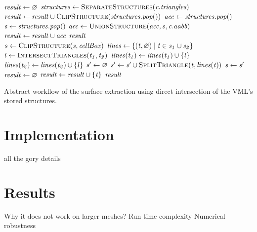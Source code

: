 \begin{algorithm}
	\centering
	\begin{algorithmic}
			\State $\mathit{result} \gets \varnothing$
					\State $\var{structures} \gets \Call{SeparateStructures}{\var{c.triangles}}$
						\State $\var{result} \gets \var{result} \cup \Call{ClipStructure}{\var{structures.pop()}}$
						\State $\mathit{acc} \gets \mathit{structures.pop()}$
							\State $\mathit{s} \gets \mathit{structures.pop()}$
							\State $\var{acc} \gets \Call{UnionStructure}{\var{acc}, \var{s}, \var{c.aabb}}$
						\EndWhile
						\State $\mathit{result} \gets \mathit{result} \cup \mathit{acc}$
					\EndIf
				\EndIf
			\EndFor
			\State \Return $\mathit{result}$
		\EndFunction
		\\
				\State $s \gets \Call{ClipStructure}{\var{s}, \var{cellBox}}$
			\EndFor
			\State $\mathit{lines} \gets \{ (\mathit{t}, \varnothing) \mid \mathit{t} \in \mathit{s_1} \cup \mathit{s_2} \}$ 
				\State $\var{l} \gets \Call{IntersectTriangles}{\var{t_1}, \var{t_2}}$
				 
					\State $\mathit{lines}(\mathit{t_1}) \gets \mathit{lines}(\mathit{t_1}) \cup \{\mathit{l}\}$
					\State $\mathit{lines}(\mathit{t_2}) \gets \mathit{lines}(\mathit{t_2}) \cup \{\mathit{l}\}$
				\EndIf
			\EndFor
				\State $\mathit{s'} \gets \varnothing$
					\State $\var{s'} \gets \var{s'} \cup \Call{SplitTriangle}{\var{t}, \var{lines}(\var{t})}$
				\EndFor
				\State $\mathit{s} \gets \mathit{s'}$
			\EndFor
			\State $\mathit{result} \gets \varnothing$
						\State $\mathit{result} \gets \mathit{result} \cup \{\mathit{t}\}$
					\EndIf
				\EndFor
			\EndFor
			\State \Return $\mathit{result}$
		\EndFunction
	\end{algorithmic}
	\caption{
		Abstract workflow of the surface extraction using direct intersection of the VML's stored structures.
	}
	\label{alg:direct_intersection}
\end{algorithm}



\section{Implementation}
\label{sec:direct_intersection_implementation}


all the gory details

\section{Results}
\label{sec:direct_intersection_results}



Why it does not work on larger meshes?
Run time complexity
Numerical robustness

